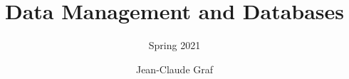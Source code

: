 \documentclass{scrartcl}
\begin{document}
    \rhead{\leftmark}


    \title{Data Management and Databases}
    \subtitle{Spring 2021}
    \author{Jean-Claude Graf}
    \maketitle

    \tableofcontents

    
    
    
    
    
    
    
    
    
    
    
    
    
    
    
    
\end{document}
